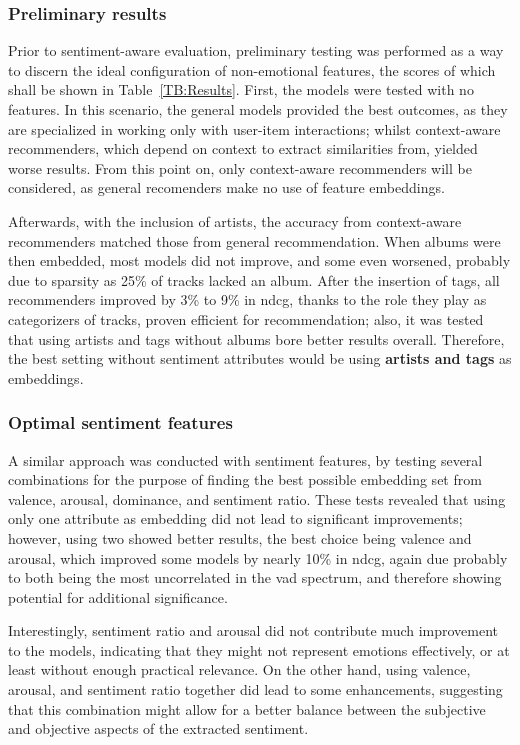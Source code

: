 \subsubsection{Preliminary results}

Prior to sentiment-aware evaluation, preliminary testing was performed as a way to discern the ideal configuration of non-emotional features, the scores of which shall be shown in Table~\ref{TB:Results}. First, the models were tested with no features. In this scenario, the general models provided the best outcomes, as they are specialized in working only with user-item interactions; whilst context-aware recommenders, which depend on context to extract similarities from, yielded worse results. From this point on, only context-aware recommenders will be considered, as general recomenders make no use of feature embeddings.

Afterwards, with the inclusion of artists, the accuracy from context-aware recommenders matched those from general recommendation. When albums were then embedded, most models did not improve, and some even worsened, probably due to sparsity as 25\% of tracks lacked an album. After the insertion of tags, all recommenders improved by 3\% to 9\% in \acs{ndcg}, thanks to the role they play as categorizers of tracks, proven efficient for recommendation; also, it was tested that using artists and tags without albums bore better results overall. Therefore, the best setting without sentiment attributes would be using \textbf{artists and tags} as embeddings.

\subsubsection{Optimal sentiment features}

A similar approach was conducted with sentiment features, by testing several combinations for the purpose of finding the best possible embedding set from valence, arousal, dominance, and sentiment ratio. These tests revealed that using only one attribute as embedding did not lead to significant improvements; however, using two showed better results, the best choice being valence and arousal, which improved some models by nearly 10\% in \acs{ndcg}, again due probably to both being the most uncorrelated in the \acs{vad} spectrum, and therefore showing potential for additional significance.

Interestingly, sentiment ratio and arousal did not contribute much improvement to the models, indicating that they might not represent emotions effectively, or at least without enough practical relevance. On the other hand, using valence, arousal, and sentiment ratio together did lead to some enhancements, suggesting that this combination might allow for a better balance between the subjective and objective aspects of the extracted sentiment.

